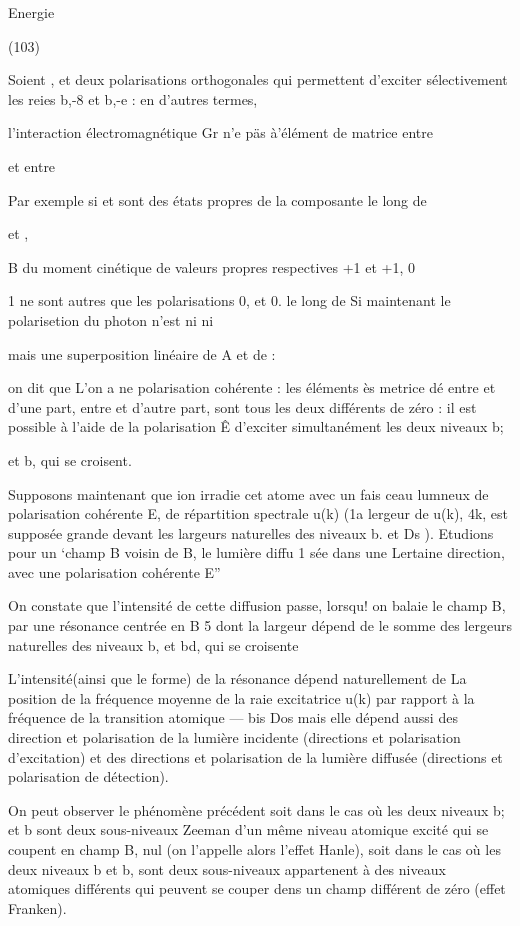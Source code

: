 Energie

(103)

Soient , et  deux polarisations orthogonales qui permettent d'exciter sélectivement les reies b,-8 et b,-e : en d'autres termes,

l'interaction électromagnétique Gr n'e päs à'élément de matrice entre

 et entre

Par exemple si  et  sont des états propres de la composante le long de

et ,

B du moment cinétique de valeurs propres respectives +1 et +1,  0

1
ne sont autres que les polarisations 0, et 0. le long de 
Si maintenant le polarisetion du photon n'est ni  ni  

mais une superposition linéaire  de A et de  :

on dit que L'on a ne polarisation cohérente : les éléments ès metrice dé
 entre  et d'une part, entre  et 
d'autre part, sont tous les deux différents de zéro : il est possible à
l'aide de la polarisation Ê d'exciter simultanément les deux niveaux b;

et b, qui se croisent.

Supposons maintenant que ion irradie cet atome avec un fais
ceau lumneux de polarisation cohérente E, de répartition spectrale u(k)
(1a lergeur de u(k), 4k, est supposée grande devant les largeurs naturelles
des niveaux b. et Ds ). Etudions pour un ‘champ B voisin de B, le lumière diffu
1
sée dans une Lertaine direction, avec une polarisation cohérente E”

On constate que l'intensité de cette diffusion passe, lorsqu!
on balaie le champ B, par une résonance centrée en B 5 dont la largeur dépend
de le somme des lergeurs naturelles des niveaux b, et bd, qui se croisente

L'intensité(ainsi que le forme) de la résonance dépend naturellement de La position de la fréquence moyenne de la raie excitatrice u(k) par
rapport à la fréquence de la transition atomique  — bis Dos mais elle dépend
aussi des direction et polarisation de la lumière incidente (directions et
polarisation d'excitation) et des directions et polarisation de la lumière
diffusée (directions et polarisation de détection).

On peut observer le phénomène précédent soit dans le cas où les
deux niveaux b; et b sont deux sous-niveaux Zeeman d'un même niveau atomique
excité qui se coupent en champ B, nul (on l'appelle alors l'effet Hanle),
soit dans le cas où les deux niveaux b et b, sont deux sous-niveaux appartenent à des niveaux atomiques différents qui peuvent se couper dens un champ
différent de zéro (effet Franken).

